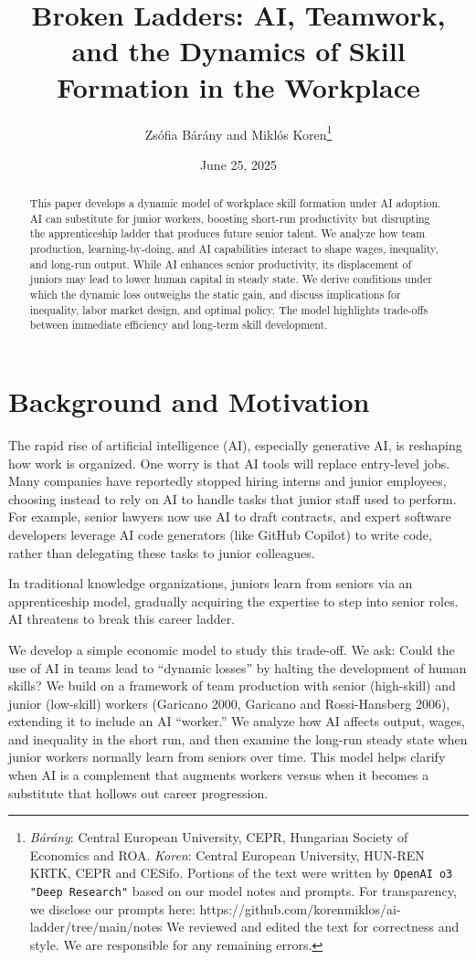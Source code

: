 \documentclass[12pt]{article}
\title{Broken Ladders: AI, Teamwork, and the Dynamics of Skill Formation in the Workplace}
\author{Zsófia Bárány and Miklós Koren\thanks{\emph{Bárány}: Central European University, CEPR, Hungarian Society of Economics and ROA. \emph{Koren}: Central European University, HUN-REN KRTK, CEPR and CESifo.  Portions of the text were written by \texttt{OpenAI o3 "Deep Research"} based on our model notes and  prompts. For transparency, we disclose our prompts here: https://github.com/korenmiklos/ai-ladder/tree/main/notes We reviewed and edited the text for correctness and style. We are responsible for any remaining errors.}}
\date{June 25, 2025}
\begin{document}
\maketitle
\begin{abstract}
This paper develops a dynamic model of workplace skill formation under AI adoption. AI can substitute for junior workers, boosting short-run productivity but disrupting the apprenticeship ladder that produces future senior talent. We analyze how team production, learning-by-doing, and AI capabilities interact to shape wages, inequality, and long-run output. While AI enhances senior productivity, its displacement of juniors may lead to lower human capital in steady state. We derive conditions under which the dynamic loss outweighs the static gain, and discuss implications for inequality, labor market design, and optimal policy. The model highlights trade-offs between immediate efficiency and long-term skill development.
\end{abstract}
\section{Background and Motivation}\label{background-and-motivation}

The rapid rise of artificial intelligence (AI), especially generative AI, is reshaping how work is organized. One worry is that AI tools will replace entry-level jobs. Many companies have reportedly stopped hiring interns and junior employees, choosing instead to rely on AI to handle tasks that junior staff used to perform. For example, {senior lawyers now use AI to draft contracts}, and {expert software developers leverage AI code generators (like GitHub Copilot) to write code}, rather than delegating these tasks to junior colleagues. 

In traditional knowledge organizations, juniors
learn from seniors via an {apprenticeship model}, gradually
acquiring the expertise to step into senior roles. AI threatens to break
this {career ladder}. 

We develop a simple economic model to study this trade-off. We
ask: {Could the use of AI in teams lead to ``dynamic losses'' by
halting the development of human skills?} We build on a framework of team production with
{senior (high-skill) and junior (low-skill) workers} (Garicano 2000, Garicano and Rossi-Hansberg 2006), extending
it to include an AI ``worker.'' We analyze how AI affects output, wages,
and inequality in the short run, and then examine the long-run steady
state when junior workers normally learn from seniors over time. This
model helps clarify when AI is a complement that {augments
workers} versus when it becomes a substitute that {hollows out
career progression}.
\end{document}
